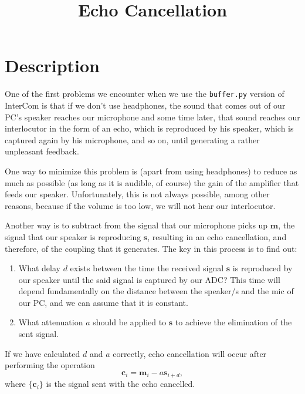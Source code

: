 
\title{Echo Cancellation}

\maketitle

\section{Description}


One of the first problems we encounter when we use the
\texttt{buffer.py} version of InterCom is that if we don't use
headphones, the sound that comes out of our PC's speaker reaches our
microphone and some time later, that sound reaches our interlocutor in
the form of an echo, which is reproduced by his speaker, which is
captured again by his microphone, and so on, until generating a rather
unpleasant feedback.

One way to minimize this problem is (apart from using headphones) to
reduce as much as possible (as long as it is audible, of course) the
gain of the amplifier that feeds our speaker. Unfortunately, this is
not always possible, among other reasons, because if the volume is too
low, we will not hear our interlocutor.

Another way is to subtract from the signal that our microphone picks
up ${\mathbf m}$, the signal that our speaker is reproducing
${\mathbf s}$, resulting in an echo cancellation, and therefore, of
the coupling that it generates. The key in this process is to find
out:

\begin{enumerate}
\item What delay $d$ exists between the time the received signal
  ${\mathbf s}$ is reproduced by our speaker until the said signal is
  captured by our ADC? This time will depend fundamentally on the
  distance between the speaker/s and the mic of our PC, and we can
  assume that it is constant.

\item What attenuation $a$ should be applied to ${\mathbf s}$ to
  achieve the elimination of the sent signal.
\end{enumerate}

If we have calculated $d$ and $a$ correctly, echo cancellation will
occur after performing the operation
\begin{equation}
   {\mathbf c}_i = {\mathbf m}_i - a{\mathbf s}_{i+d},
\end{equation}
where $\{{\mathbf c}_i\}$ is the signal sent with the echo cancelled.


